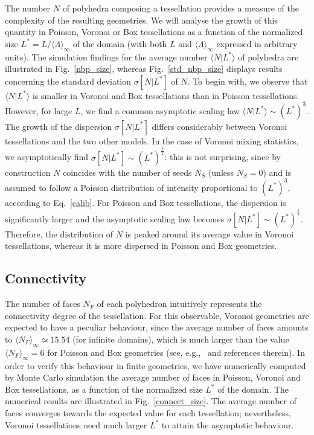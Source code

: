 \documentclass[final,authoryear,5p,times,twocolumn]{elsarticle}
\begin{document}
The number $N$ of polyhedra composing a tessellation provides a measure of the complexity of the resulting geometries. We will analyse the growth of this quantity in Poisson, Voronoi or Box tessellations as a function of the normalized size $L^*=L/{\langle \Lambda \rangle}_{\infty}$ of the domain (with both $L$ and ${\langle \Lambda \rangle}_{\infty}$ expressed in arbitrary units). The simulation findings for the average number $\langle N | L^*\rangle$  of polyhedra are illustrated in Fig.~\ref{nbp_size}, whereas Fig.~\ref{std_nbp_size} displays results concerning the standard deviation $\sigma[N|L^*]$ of $N$. To begin with, we observe that $\langle N | L^* \rangle$ is smaller in Voronoi and Box tessellations than in Poisson tessellations. However, for large $L$, we find a common asymptotic scaling law $\langle N | L^* \rangle \sim {(L^*)}^3$. The growth of the dispersion $\sigma[N|L^*]$ differs considerably between Voronoi tessellations and the two other models. In the case of Voronoi mixing statistics, we asymptotically find $\sigma[N|L^*] \sim (L^*)^\frac{3}{2}$: this is not surprising, since by construction $N$ coincides with the number of seeds $N_S$ (unless $N_S=0$) and is assumed to follow a Poisson distribution of intensity proportional to $(L^*)^3$, according to Eq.~\ref{calib}. For Poisson and Box tessellations, the dispersion is significantly larger and the asymptotic scaling law becomes $\sigma[N|L^*] \sim (L^*)^\frac{5}{2}$. Therefore, the distribution of $N$ is peaked around its average value in Voronoi tessellations, whereas it is more dispersed in Poisson and Box geometries.

\subsection{Connectivity}

The number of faces $N_F$ of each polyhedron intuitively represents the connectivity degree of the tessellation. For this observable, Voronoi geometries are expected to have a peculiar behaviour, since the average number of faces amounts to $\langle N_F \rangle_\infty \simeq 15.54$ (for infinite domains), which is much larger than the value $\langle N_F \rangle_\infty = 6$ for Poisson and Box geometries (see, e.g.,~\cite{santalo, miles1972} and references therein). In order to verify this behaviour in finite geometries, we have numerically computed by Monte Carlo simulation the average number of faces in Poisson, Voronoi and Box tessellations, as a function of the normalized size $L^*$ of the domain. The numerical results are illustrated in Fig.~\ref{connect_size}. The average number of faces converges towards the expected value for each tessellation; nevertheless, Voronoi tessellations need much larger $L^*$ to attain the asymptotic behaviour.
\end{document}
